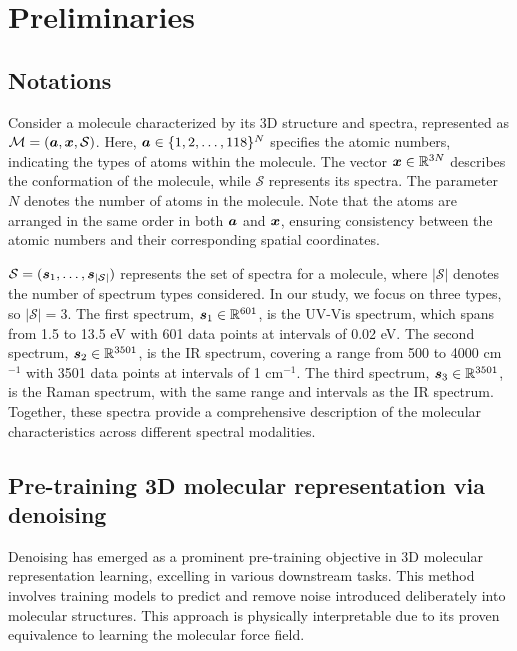 \section{Preliminaries}

\subsection{Notations}

Consider a molecule characterized by its 3D structure and spectra, represented as \(\mathcal{M} = ({\bm{a}}, {\bm{x}}, \mathcal{S})\). Here, \({\bm{a}} \in \{1, 2, \ldots, 118\}^N\) specifies the atomic numbers, indicating the types of atoms within the molecule. The vector \({\bm{x}} \in \mathbb{R}^{3N}\) describes the conformation of the molecule, while \(\mathcal{S}\) represents its spectra. The parameter \(N\) denotes the number of atoms in the molecule. Note that the atoms are arranged in the same order in both \({\bm{a}}\) and \({\bm{x}}\), ensuring consistency between the atomic numbers and their corresponding spatial coordinates.

\( \mathcal{S} = ({\bm{s}}_1, \ldots, {\bm{s}}_{|\mathcal{S}|}) \) represents the set of spectra for a molecule, where \(|\mathcal{S}|\) denotes the number of spectrum types considered. In our study, we focus on three types, so \(|\mathcal{S}|=3\). The first spectrum, \( {\bm{s}}_1 \in \mathbb{R}^{601} \), is the UV-Vis spectrum, which spans from 1.5 to 13.5 eV with 601 data points at intervals of 0.02 eV. The second spectrum, \( {\bm{s}}_2 \in \mathbb{R}^{3501} \), is the IR spectrum, covering a range from 500 to 4000 cm\(^{-1}\) with 3501 data points at intervals of 1 cm\(^{-1}\). The third spectrum, \( {\bm{s}}_3 \in \mathbb{R}^{3501} \), is the Raman spectrum, with the same range and intervals as the IR spectrum. Together, these spectra provide a comprehensive description of the molecular characteristics across different spectral modalities.


\subsection{Pre-training 3D molecular representation via denoising}\label{sec:denoising}

Denoising has emerged as a prominent pre-training objective in 3D molecular representation learning, excelling in various downstream tasks. This method involves training models to predict and remove noise introduced deliberately into molecular structures. This approach is physically interpretable due to its proven equivalence to learning the molecular force field. 

